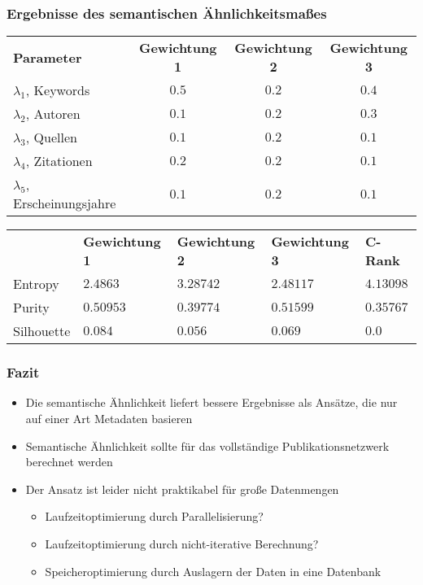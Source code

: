 \documentclass[12pt, xcolor=table]{beamer}
\begin{document}
\begin{frame}
    \frametitle{Ergebnisse des semantischen Ähnlichkeitsmaßes}
    \scriptsize{
    \begin{table}[H]
    \centering
    \begin{tabular}{l c c c}
		\textbf{Parameter} &\textbf{Gewichtung 1} &\textbf{Gewichtung 2} &\textbf{Gewichtung 3} \\
		$\lambda_1$, Keywords & $0.5$ & $0.2$ & $0.4$\\
		$\lambda_2$, Autoren & $0.1$ & $0.2$ & $0.3$\\
		$\lambda_3$, Quellen & $0.1$ & $0.2$ & $0.1$\\
		$\lambda_4$, Zitationen & $0.2$ & $0.2$ & $0.1$\\
		$\lambda_5$, Erscheinungsjahre & $0.1$ & $0.2$ & $0.1$\\
    \end{tabular}
    \end{table}
    }
    \scriptsize{
    \begin{table}[H]
    \centering
    \begin{tabular}{l l l l l}
		     &\textbf{Gewichtung 1} &\textbf{Gewichtung 2} &\textbf{Gewichtung 3} & \textbf{C-Rank} \\
	    	Entropy & $2.4863$ & $3.28742$ & $2.48117$ & $4.13098$\\
		    Purity & $0.50953$ & $0.39774$ & $0.51599$ & $0.35767$\\
    		Silhouette & $0.084$ & $0.056$ & $0.069$ & $0.0$ \\
    \end{tabular}
\end{table}
}
\end{frame}

\begin{frame}
    \frametitle{Fazit}
    \begin{itemize}
    \item Die semantische Ähnlichkeit liefert bessere Ergebnisse als Ansätze, die nur auf einer Art Metadaten basieren
    \item Semantische Ähnlichkeit sollte für das vollständige Publikationsnetzwerk berechnet werden
    \item Der Ansatz ist leider nicht praktikabel für große Datenmengen
        \begin{itemize}
            \item Laufzeitoptimierung durch Parallelisierung?
            \item Laufzeitoptimierung durch nicht-iterative Berechnung?
            \item Speicheroptimierung durch Auslagern der Daten in eine Datenbank
        \end{itemize}
    \end{itemize}
\end{frame}
\end{document}
